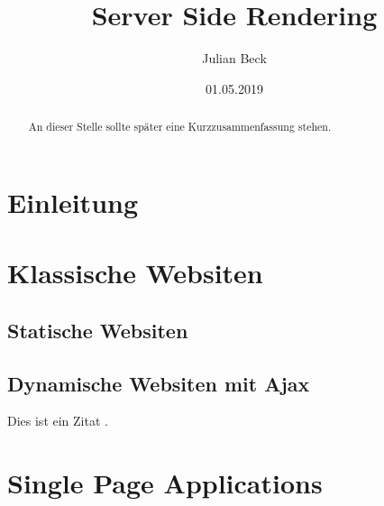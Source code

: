 \documentclass[runningheads]{llncs}
\title{Server Side Rendering}
\author{Julian Beck}
\institute{Betreuer: Prof. Dr. rer. nat. Christian Zirpins}
\date{01.05.2019}
\begin{document}
\let\oldaddcontentsline\addcontentsline
\def\addcontentsline#1#2#3{}
\maketitle
\def\addcontentsline#1#2#3{\oldaddcontentsline{#1}{#2}{#3}}


\begin{abstract}
  An dieser Stelle sollte später eine Kurzzusammenfassung stehen.
\end{abstract}

\tableofcontents 
\newpage

\section{Einleitung}
\label{sec:Einleitung}




\section{Klassische Websiten}
\label{sec:Klassische Websiten}

\subsection{Statische Websiten}
\label{subsec:Statische Websiten}

\subsection{Dynamische Websiten mit Ajax}
\label{subsec:Dynamische Websiten mit Ajax}



Dies ist ein Zitat \cite{becker2008a}.


\section{Single Page Applications}
\label{sec:Single Page Applications}
\end{document}
